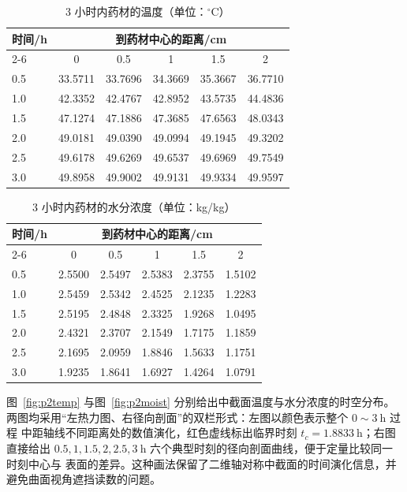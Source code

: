 \documentclass[12pt,a4paper]{ctexart}
\begin{document}
\begin{table}[H]
\centering
\begin{tabular}{lccccc}
\toprule
\multirow{2}{*}{时间/h} & \multicolumn{5}{c}{到药材中心的距离/cm} \\
\cmidrule(lr){2-6}
 & 0 & 0.5 & 1 & 1.5 & 2 \\
\midrule
0.5 & 33.5711 & 33.7696 & 34.3669 & 35.3667 & 36.7710 \\
1.0 & 42.3352 & 42.4767 & 42.8952 & 43.5735 & 44.4836 \\
1.5 & 47.1274 & 47.1886 & 47.3685 & 47.6563 & 48.0343 \\
2.0 & 49.0181 & 49.0390 & 49.0994 & 49.1945 & 49.3202 \\
2.5 & 49.6178 & 49.6269 & 49.6537 & 49.6969 & 49.7549 \\
3.0 & 49.8958 & 49.9002 & 49.9131 & 49.9334 & 49.9597 \\
\bottomrule
\end{tabular}
\caption{3 小时内药材的温度（单位：$^\circ$C）}
\label{tab:T2}
\end{table}

\begin{table}[H]
\centering
\begin{tabular}{lccccc}
\toprule
\multirow{2}{*}{时间/h} & \multicolumn{5}{c}{到药材中心的距离/cm} \\
\cmidrule(lr){2-6}
 & 0 & 0.5 & 1 & 1.5 & 2 \\
\midrule
0.5 & 2.5500 & 2.5497 & 2.5383 & 2.3755 & 1.5102 \\
1.0 & 2.5459 & 2.5342 & 2.4525 & 2.1235 & 1.2283 \\
1.5 & 2.5195 & 2.4848 & 2.3325 & 1.9268 & 1.0495 \\
2.0 & 2.4321 & 2.3707 & 2.1549 & 1.7175 & 1.1859 \\
2.5 & 2.1695 & 2.0959 & 1.8846 & 1.5633 & 1.1751 \\
3.0 & 1.9235 & 1.8641 & 1.6927 & 1.4264 & 1.0791 \\
\bottomrule
\end{tabular}
\caption{3 小时内药材的水分浓度（单位：kg/kg）}
\label{tab:C2}
\end{table}

图~\ref{fig:p2temp} 与图~\ref{fig:p2moist} 分别给出中截面温度与水分浓度的时空分布。
两图均采用“左热力图、右径向剖面”的双栏形式：左图以颜色表示整个 $0\sim3\ \mathrm{h}$ 过程
中距轴线不同距离处的数值演化，红色虚线标出临界时刻 $t_c=1.8833\ \mathrm{h}$；右图直接给出
$0.5,1,1.5,2,2.5,3\ \mathrm{h}$ 六个典型时刻的径向剖面曲线，便于定量比较同一时刻中心与
表面的差异。这种画法保留了二维轴对称中截面的时间演化信息，并避免曲面视角遮挡读数的问题。
\end{document}
